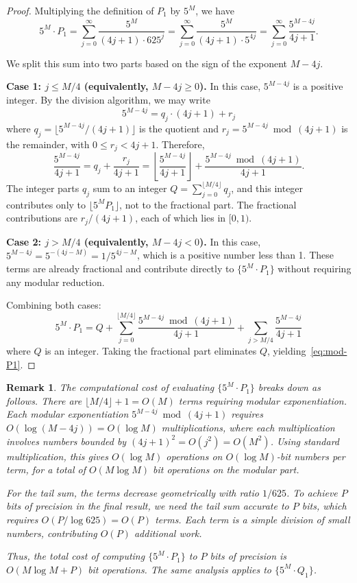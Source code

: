 \documentclass[11pt]{article}
\newtheorem{remark}[theorem]{Remark}
\begin{document}
\begin{proof}
Multiplying the definition of $P_1$ by $5^M$, we have
\[
5^M \cdot P_1 = \sum_{j=0}^{\infty} \frac{5^M}{(4j+1) \cdot 625^j} = \sum_{j=0}^{\infty} \frac{5^M}{(4j+1) \cdot 5^{4j}} = \sum_{j=0}^{\infty} \frac{5^{M-4j}}{4j+1}.
\]

We split this sum into two parts based on the sign of the exponent $M - 4j$.

\textbf{Case 1: $j \leq M/4$ (equivalently, $M - 4j \geq 0$).} In this case, $5^{M-4j}$ is a positive integer. By the division algorithm, we may write
\[
5^{M-4j} = q_j \cdot (4j+1) + r_j
\]
where $q_j = \lfloor 5^{M-4j}/(4j+1) \rfloor$ is the quotient and $r_j = 5^{M-4j} \bmod (4j+1)$ is the remainder, with $0 \leq r_j < 4j+1$. Therefore,
\[
\frac{5^{M-4j}}{4j+1} = q_j + \frac{r_j}{4j+1} = \left\lfloor \frac{5^{M-4j}}{4j+1} \right\rfloor + \frac{5^{M-4j} \bmod (4j+1)}{4j+1}.
\]
The integer parts $q_j$ sum to an integer $Q = \sum_{j=0}^{\lfloor M/4 \rfloor} q_j$, and this integer contributes only to $\lfloor 5^M P_1 \rfloor$, not to the fractional part. The fractional contributions are $r_j/(4j+1)$, each of which lies in $[0,1)$.

\textbf{Case 2: $j > M/4$ (equivalently, $M - 4j < 0$).} In this case, $5^{M-4j} = 5^{-(4j-M)} = 1/5^{4j-M}$, which is a positive number less than 1. These terms are already fractional and contribute directly to $\{5^M \cdot P_1\}$ without requiring any modular reduction.

Combining both cases:
\[
5^M \cdot P_1 = Q + \sum_{j=0}^{\lfloor M/4 \rfloor} \frac{5^{M-4j} \bmod (4j+1)}{4j+1} + \sum_{j > M/4} \frac{5^{M-4j}}{4j+1}
\]
where $Q$ is an integer. Taking the fractional part eliminates $Q$, yielding~\eqref{eq:mod-P1}.
\end{proof}

\begin{remark}\label{rem:complexity-P1}
The computational cost of evaluating $\{5^M \cdot P_1\}$ breaks down as follows. There are $\lfloor M/4 \rfloor + 1 = O(M)$ terms requiring modular exponentiation. Each modular exponentiation $5^{M-4j} \bmod (4j+1)$ requires $O(\log(M-4j)) = O(\log M)$ multiplications, where each multiplication involves numbers bounded by $(4j+1)^2 = O(j^2) = O(M^2)$. Using standard multiplication, this gives $O(\log M)$ operations on $O(\log M)$-bit numbers per term, for a total of $O(M \log M)$ bit operations on the modular part.

For the tail sum, the terms decrease geometrically with ratio $1/625$. To achieve $P$ bits of precision in the final result, we need the tail sum accurate to $P$ bits, which requires $O(P/\log 625) = O(P)$ terms. Each term is a simple division of small numbers, contributing $O(P)$ additional work.

Thus, the total cost of computing $\{5^M \cdot P_1\}$ to $P$ bits of precision is $O(M \log M + P)$ bit operations. The same analysis applies to $\{5^M \cdot Q_1\}$.
\end{remark}
\end{document}
